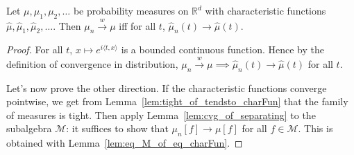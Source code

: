 \begin{theorem}
\label{thm:charFun_tendsto_iff_measure_tendsto}
\leanok
{}
Let $\mu, \mu_1, \mu_2, \ldots$ be probability measures on $\mathbb{R}^d$ with characteristic functions $\hat{\mu}, \hat{\mu}_1, \hat{\mu}_2, \ldots$. Then $\mu_n \xrightarrow{w} \mu$ iff for all $t$, $\hat{\mu}_n(t) \to \hat{\mu}(t)$.
\end{theorem}

\begin{proof}
For all $t$, $x \mapsto e^{i \langle t, x \rangle}$ is a bounded continuous function. Hence by the definition of convergence in distribution, $\mu_n \xrightarrow{w} \mu \implies \hat{\mu}_n(t) \to \hat{\mu}(t)$ for all $t$.

Let's now prove the other direction.
If the characteristic functions converge pointwise, we get from Lemma~\ref{lem:tight_of_tendsto_charFun} that the family of measures is tight.
Then apply Lemma~\ref{lem:cvg_of_separating} to the subalgebra $\mathcal M$: it suffices to show that $\mu_n[f] \to \mu[f]$ for all $f \in \mathcal M$. This is obtained with Lemma~\ref{lem:eq_M_of_eq_charFun}.
\end{proof}